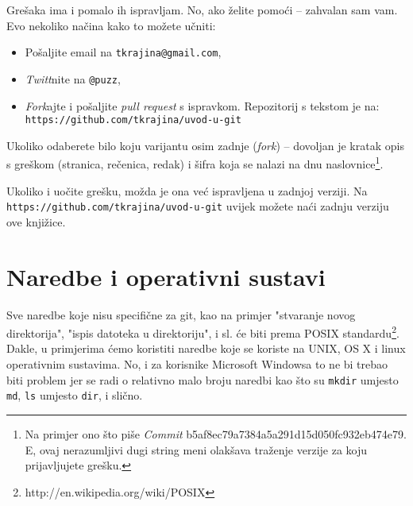 Grešaka ima i pomalo ih ispravljam.
No, ako želite pomoći -- zahvalan sam vam.
Evo nekoliko načina kako to možete učniti:

\begin{itemize}
    \item Pošaljite email na \verb+tkrajina@gmail.com+,
    \item \emph{Twitt}nite na \verb+@puzz+,
    \item \emph{Fork}ajte i pošaljite \emph{pull request} s ispravkom. Repozitorij s tekstom je na: \\ \verb+https://github.com/tkrajina/uvod-u-git+
\end{itemize}

Ukoliko odaberete bilo koju varijantu osim zadnje (\emph{fork}) -- dovoljan je kratak opis s greškom (stranica, rečenica, redak) i šifra koja se nalazi na dnu naslovnice\footnote{Na primjer ono što piše \emph{Commit} b5af8ec79a7384a5a291d15d050fc932eb474e79. E, ovaj nerazumljivi dugi string meni olakšava traženje verzije za koju prijavljujete grešku.}.

Ukoliko i uočite grešku, možda je ona već ispravljena u zadnjoj verziji. 
Na \\ \verb+https://github.com/tkrajina/uvod-u-git+ uvijek možete naći zadnju verziju ove knjižice.

\section*{Naredbe i operativni sustavi}

Sve naredbe koje nisu specifične za git, kao na primjer "stvaranje novog direktorija", "ispis datoteka u direktoriju", i sl. će biti prema POSIX standardu\footnote{http://en.wikipedia.org/wiki/POSIX}.
Dakle, u primjerima ćemo koristiti naredbe koje se koriste na UNIX, OS X i linux operativnim sustavima. 
No, i za korisnike Microsoft Windowsa to ne bi trebao biti problem jer se radi o relativno malo broju naredbi kao što su \verb+mkdir+ umjesto \verb+md+, \verb+ls+ umjesto \verb+dir+, i slično.
